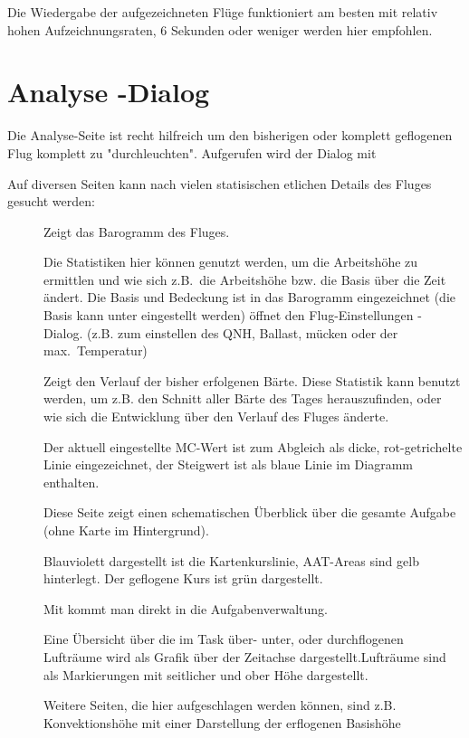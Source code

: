 Die Wiedergabe der aufgezeichneten Flüge funktioniert am besten mit relativ hohen Aufzeichnungsraten, 6 Sekunden oder weniger werden hier empfohlen.

\section{Analyse -Dialog}\label{sec:analysis-dialog-climb}
Die Analyse-Seite ist recht hilfreich um den bisherigen oder komplett geflogenen Flug komplett zu "durchleuchten".  Aufgerufen wird der Dialog mit


Auf diversen Seiten kann nach vielen statisischen etlichen Details  des Fluges gesucht werden:


\begin{description}
\item[]  Zeigt das Barogramm des Fluges.

Die Statistiken hier können genutzt werden, um die Arbeitshöhe zu ermittlen und wie sich z.B.\  die Arbeitshöhe bzw. die Basis über die Zeit ändert. Die Basis und Bedeckung ist in das Barogramm eingezeichnet (die Basis kann unter   eingestellt werden)
  öffnet den Flug-Einstellungen - Dialog.
  (z.B. zum einstellen des QNH, Ballast, mücken oder der max.\ Temperatur)
\vspace{7em}

\item[]
  Zeigt den Verlauf der bisher erfolgenen Bärte.
  Diese Statistik kann benutzt werden, um z.B. den Schnitt aller Bärte des Tages herauszufinden, oder wie sich die Entwicklung über den Verlauf des Fluges änderte.

  Der aktuell eingestellte MC-Wert  ist zum Abgleich als dicke, rot-getrichelte Linie eingezeichnet, der Steigwert ist als blaue Linie im Diagramm enthalten.

\vspace{5em}
\newpage
\item[]
Diese Seite zeigt einen schematischen Überblick über die gesamte Aufgabe (ohne Karte im Hintergrund).


Blauviolett dargestellt ist die Kartenkurslinie, AAT-Areas sind gelb hinterlegt. 
Der geflogene Kurs ist grün dargestellt.

Mit  kommt man direkt in die Aufgabenverwaltung.


\vspace{7em}
\item[]
Eine Übersicht über die im Task über- unter, oder durchflogenen Lufträume wird als Grafik über der Zeitachse dargestellt.Lufträume sind als Markierungen mit seitlicher und ober Höhe  dargestellt.

Weitere Seiten, die hier aufgeschlagen werden können,  sind z.B. Konvektionshöhe mit einer Darstellung der erflogenen Basishöhe
\vspace{7em}

\end{description}

